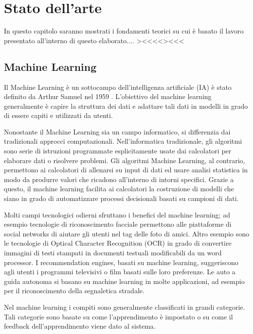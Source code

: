 \chapter{Stato dell'arte}
\label{statodellarte}
In questo capitolo saranno mostrati i fondamenti teorici su cui è basato il lavoro presentato all'interno di questo elaborato.... ><<<<><<<

\newpage
\section{Machine Learning}
\label{machinelearning}
Il Machine Learning è un sottocampo dell'intelligenza artificiale (IA) è stato definito da Arthur Samuel nel 1959 \cite{5392560}. L'obiettivo del machine learning generalmente è capire la struttura dei dati e adattare tali dati in modelli in grado di essere capiti e utilizzati da utenti.

Nonostante il Machine Learning sia un campo informatico, si differenzia dai tradizionali approcci computazionali. Nell'informatica tradizionale, gli algoritmi sono serie di istruzioni programmate esplicitamente usate dai calcolatori per elaborare dati o risolvere problemi. Gli algoritmi Machine Learning, al contrario, permettono ai calcolatori di allenarsi su input di dati ed usare analisi statistica in modo da produrre valori che ricadono all'interno di intorni specifici. Grazie a questo, il machine learning facilita ai calcolatori la costruzione di modelli che siano in grado di automatizzare processi decisionali basati su campioni di dati.

Molti campi tecnologici odierni sfruttano i benefici del machine learning; ad esempio tecnologie di riconoscimento facciale permettono alle piattaforme di social networks di aiutare gli utenti nel tag delle foto di amici. Altro esempio sono le tecnologie di Optical Character Recognition (OCR) in grado di convertire immagini di testi stampati in documenti testuali modificabili da un word processor. I recommendation engines, basati su machine learning, suggeriscono agli utenti i programmi televisivi o film basati sulle loro preferenze. Le auto a guida autonoma si basano su machine learning in molte applicazioni, ad esempio per il riconoscimento della segnaletica stradale.

Nel machine learning i compiti sono generalmente classificati in grandi categorie. Tali categorie sono basate su come l'apprendimento è impostato o su come il feedback dell'apprendimento viene dato al sistema.

